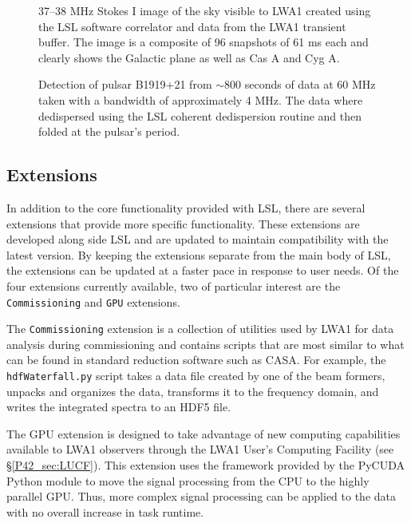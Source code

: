\documentclass[11pt,twoside]{article}
\begin{document}
\begin{figure}
	\caption{\label{P42_fig:sky}37--38 MHz Stokes I image of the sky visible to LWA1 created using the LSL software correlator and data from the LWA1 transient buffer.  The image is a composite of 96 snapshots of 61 ms each and clearly shows the Galactic plane as well as Cas A and Cyg A.}
\end{figure}

\begin{figure}
	\caption{\label{P42_fig:psr}Detection of pulsar B1919+21 from $\sim$800 seconds of data at 60 MHz taken with a bandwidth of approximately 4 MHz.  The data where dedispersed using the LSL coherent dedispersion routine and then folded at the pulsar's period.}
\end{figure}

\subsection{Extensions}
In addition to the core functionality provided with LSL, there are several extensions that provide more specific functionality.  These extensions are developed along side LSL and  are updated to maintain compatibility with the latest version.  By keeping the extensions separate from the main body of LSL, the extensions can be updated at a faster pace in response to user needs.  Of the four extensions currently available, two of particular interest are the {\tt Commissioning} and {\tt GPU} extensions.

The {\tt Commissioning} extension is a collection of utilities used by LWA1 for data analysis during commissioning and contains scripts that are most similar to what can be found in standard reduction software such as CASA.  For example, the {\tt hdfWaterfall.py} script takes a data file created by one of the beam formers, unpacks and organizes the data, transforms it to the frequency domain, and writes the integrated spectra to an HDF5 file.  

 The GPU extension is designed to take advantage of new computing capabilities available to LWA1 observers through the LWA1 User's Computing Facility (see \S\ref{P42_sec:LUCF}).  This extension uses the framework provided by the PyCUDA \citep{PyCUDA} Python module to move the signal processing from the CPU to the highly parallel GPU.  Thus, more complex signal processing can be applied to the data with no overall increase in task runtime.
\end{document}
